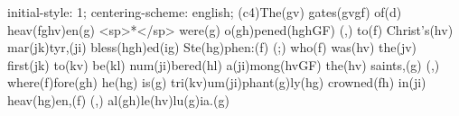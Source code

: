 initial-style: 1;
centering-scheme: english;
(c4)The(gv) gates(gvgf) of(d) heav(fghv)en(g) <sp>*</sp> were(g) o(gh)pened(hghGF) (,) to(f) Christ's(hv) mar(jk)tyr,(ji) bless(hgh)ed(ig) Ste(hg)phen:(f) (;) who(f) was(hv) the(jv) first(jk) to(kv) be(kl) num(ji)bered(hl) a(ji)mong(hvGF) the(hv) saints,(g) (,) where(f)fore(gh) he(hg) is(g) tri(kv)um(ji)phant(g)ly(hg) crowned(fh) in(ji) heav(hg)en,(f) (,) al(gh)le(hv)lu(g)ia.(g)
